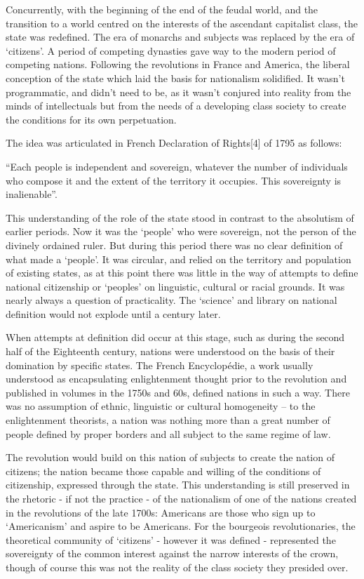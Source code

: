 Concurrently, with the beginning of the end of the feudal world, and the transition to a world centred on the interests of the ascendant capitalist class, the state was redefined.
The era of monarchs and subjects was replaced by the era of ‘citizens’.
A period of competing dynasties gave way to the modern period of competing nations.
Following the revolutions in France and America, the liberal conception of the state which laid the basis for nationalism solidified.
It wasn’t programmatic, and didn’t need to be, as it wasn’t conjured into reality from the minds of intellectuals but from the needs of a developing class society to create the conditions for its own perpetuation.

The idea was articulated in French Declaration of Rights[4] of 1795 as follows:

“Each people is independent and sovereign, whatever the number of individuals who compose it and the extent of the territory it occupies.
This sovereignty is inalienable”.

This understanding of the role of the state stood in contrast to the absolutism of earlier periods.
Now it was the ‘people’ who were sovereign, not the person of the divinely ordained ruler.
But during this period there was no clear definition of what made a ‘people’.
It was circular, and relied on the territory and population of existing states, as at this point there was little in the way of attempts to define national citizenship or ‘peoples’ on linguistic, cultural or racial grounds.
It was nearly always a question of practicality.
The ‘science’ and library on national definition would not explode until a century later.

When attempts at definition did occur at this stage, such as during the second half of the Eighteenth century, nations were understood on the basis of their domination by specific states.
The French Encyclopédie, a work usually understood as encapsulating enlightenment thought prior to the revolution and published in volumes in the 1750s and 60s, defined nations in such a way.
There was no assumption of ethnic, linguistic or cultural homogeneity – to the enlightenment theorists, a nation was nothing more than a great number of people defined by proper borders and all subject to the same regime of law.

The revolution would build on this nation of subjects to create the nation of citizens; the nation became those capable and willing of the conditions of citizenship, expressed through the state.
This understanding is still preserved in the rhetoric - if not the practice - of the nationalism of one of the nations created in the revolutions of the late 1700s: Americans are those who sign up to ‘Americanism’ and aspire to be Americans.
For the bourgeois revolutionaries, the theoretical community of ‘citizens’ - however it was defined - represented the sovereignty of the common interest against the narrow interests of the crown, though of course this was not the reality of the class society they presided over.

